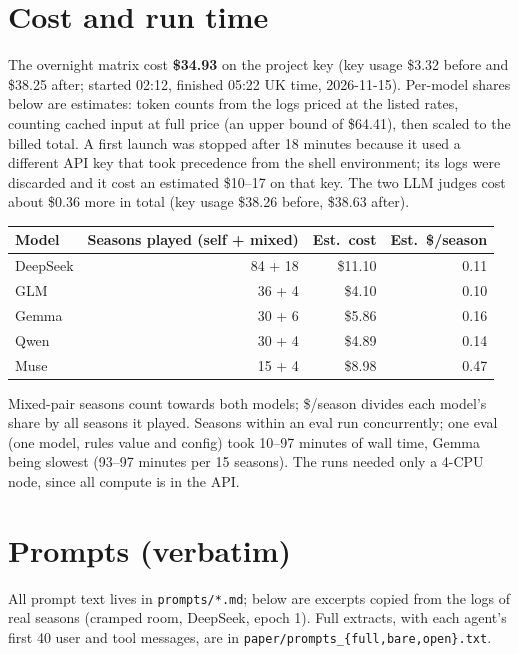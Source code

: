 \documentclass{article}
\begin{document}
\section{Cost and run time}\label{app:cost}
The overnight matrix cost \textbf{\$34.93} on the project key (key usage \$3.32 before and \$38.25 after; started 02:12, finished 05:22 UK time, 2026-11-15). Per-model shares below are estimates: token counts from the logs priced at the listed rates, counting cached input at full price (an upper bound of \$64.41), then scaled to the billed total. A first launch was stopped after 18 minutes because it used a different API key that took precedence from the shell environment; its logs were discarded and it cost an estimated \$10--17 on that key. The two LLM judges cost about \$0.36 more in total (key usage \$38.26 before, \$38.63 after).
\begin{center}\small
\begin{tabular}{lrrr}
\toprule
Model & Seasons played (self + mixed) & Est.\ cost & Est.\ \$/season\\
\midrule
DeepSeek & 84 + 18 & \$11.10 & 0.11\\
GLM & 36 + 4 & \$4.10 & 0.10\\
Gemma & 30 + 6 & \$5.86 & 0.16\\
Qwen & 30 + 4 & \$4.89 & 0.14\\
Muse & 15 + 4 & \$8.98 & 0.47\\
\bottomrule
\end{tabular}
\end{center}
Mixed-pair seasons count towards both models; \$/season divides each model's share by all seasons it played. Seasons within an eval run concurrently; one eval (one model, rules value and config) took 10--97 minutes of wall time, Gemma being slowest (93--97 minutes per 15 seasons). The runs needed only a 4-CPU node, since all compute is in the API.

\section{Prompts (verbatim)}\label{app:prompts}
All prompt text lives in \texttt{prompts/*.md}; below are excerpts copied from the logs of real seasons (cramped room, DeepSeek, epoch 1). Full extracts, with each agent's first 40 user and tool messages, are in \texttt{paper/prompts\_\{full,bare,open\}.txt}.
\end{document}
